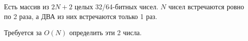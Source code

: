 \begin{problem}

Есть массив из $2N+2$ целых 32/64-битных чисел. $N$ чисел встречаются ровно по 2
раза, а ДВА из них встречаются только 1 раз.

Требуется за $O(N)$ определить эти 2 числа.
\end{problem}